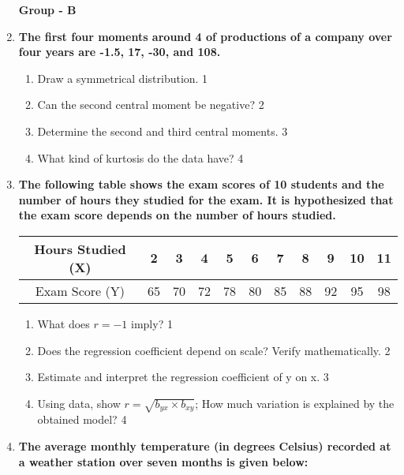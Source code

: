 \documentclass[12pt]{article}
\begin{document}
\begin{enumerate}

\begin{center}
\textbf{Group  - B}
\end{center}
  
     \item
	  \textbf{The first four moments around 4 of productions of a company over four years are -1.5, 17, -30, and 108.} 
  
  \begin{enumerate}
  \item Draw a symmetrical distribution.   \hfill 1
    \item
	Can the second central moment be negative? \hfill 2
    \item  
	Determine the second and third central moments. \hfill 3
    \item
	What kind of kurtosis do the data have? \hfill 4
  \end{enumerate}


  \item
	  \textbf{The following table shows the exam scores of 10 students and the number of hours they studied for the exam. It is hypothesized that the exam score depends on the number of hours studied.} 
	  
\begin{table}[h!]
\centering
\begin{tabular}{c|c|c|c|c|c|c|c|c|c|c}
Hours Studied (X) & 2 & 3 & 4 & 5 & 6 & 7 & 8 & 9 & 10 & 11 \\ \hline
Exam Score (Y) & 65 & 70 & 72 & 78 & 80 & 85 & 88 & 92 & 95 & 98 \\
\end{tabular}
\end{table}
  
  \begin{enumerate}
    \item What does $r=-1$ imply? \hfill 1
  \item Does the regression coefficient depend on scale? Verify mathematically. \hfill 2
    \item  
	Estimate and interpret the regression coefficient of y on x. \hfill 3
    \item
	Using data, show $r = \sqrt{b_{yx} \times b_{xy}}$; How much variation is explained by the obtained model? \hfill 4
  \end{enumerate}
  
\item
\textbf{The average monthly temperature (in degrees Celsius) recorded at a weather station over seven months is given below:}


\end{enumerate}
\end{document}

